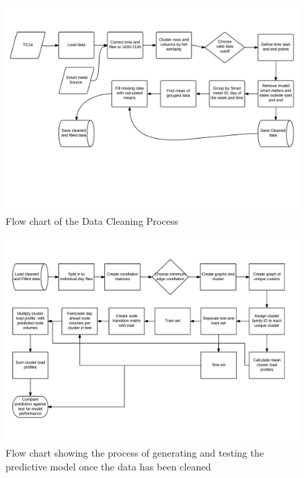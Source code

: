 \begin{landscape}

\begin{figure}[ht]
    \centering
    \includegraphics[width =\textwidth]{Figures/Appendix/DataCleaning.png}
    \caption[Data cleaning process]{Flow chart of the Data Cleaning Process}
    \label{fig:CleanFlow}
\end{figure}


\begin{figure}[ht]
    \centering
    \includegraphics[width =\textwidth]{Figures/Appendix/Thesisprocess.png}
    \caption[Project process]{Flow chart showing the process of generating and testing the predictive model once the data has been cleaned}
    \label{fig:ProcessFlow}
\end{figure}


\end{landscape}
\fi

